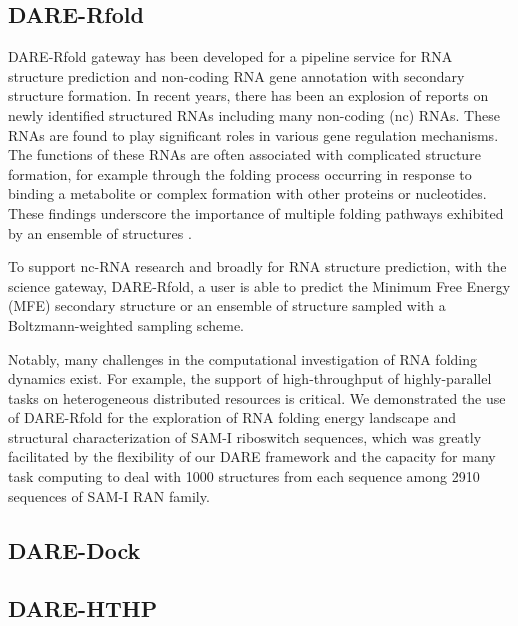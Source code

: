 \documentclass[12pt]{article}
\begin{document}
\subsection{DARE-Rfold}
DARE-Rfold gateway has been developed for a pipeline service for RNA structure prediction and non-coding RNA gene annotation with secondary structure formation.  In recent years, there has been an explosion of reports on newly
identified structured RNAs including many non-coding (nc) RNAs. These
RNAs are found to play significant roles in various gene regulation
mechanisms\cite{joyce1999,serganov2007,cruz2009,encode2007,amaral2008}.
The functions of these RNAs are often associated with complicated
structure formation, for example through the folding process occurring
in response to binding a metabolite or complex formation with other
proteins or nucleotides. These findings underscore the importance of
multiple folding pathways exhibited by an ensemble of structures
\cite{baek2008,blouin2009,dambach2009,hyeon2008,herschlag-nature-2010,ma2006}.

To support nc-RNA research and broadly for RNA structure prediction, with the science gateway, DARE-Rfold, a user is able to predict the Minimum Free Energy (MFE) secondary structure or an ensemble of structure sampled with a Boltzmann-weighted sampling scheme.  

Notably, many challenges in the computational investigation of RNA
folding dynamics exist.  For example, the support of high-throughput of highly-parallel tasks on heterogeneous distributed resources is critical.
We demonstrated the use of DARE-Rfold for the exploration of RNA folding energy landscape and structural characterization of SAM-I riboswitch sequences, which was greatly facilitated by the flexibility of our DARE framework and the capacity for many task computing to deal with 1000 structures from each sequence among 2910 sequences of SAM-I RAN family. 

\subsection{DARE-Dock}



\subsection{DARE-HTHP}
\end{document}
